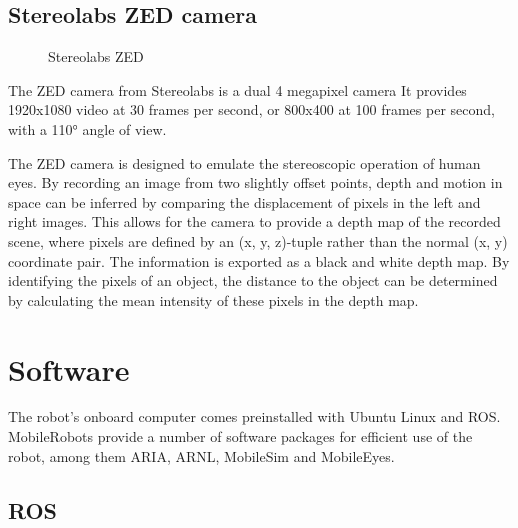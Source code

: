 \documentclass[\rootfolder/main.tex]{subfiles}
\begin{document}

\subsection{Stereolabs ZED camera}

\begin{figure}
    \caption{Stereolabs ZED}
    \label{fig:zed-camera}
\end{figure}

The ZED camera from Stereolabs is a dual 4 megapixel camera
It provides 1920x1080 video at 30 frames per second, or 800x400 at 100 frames per second, with a \ang{110} angle of view.

The ZED camera is designed to emulate the stereoscopic operation of human eyes.
By recording an image from two slightly offset points, depth and motion in space can be inferred by comparing the displacement of pixels in the left and right images.
This allows for the camera to provide a depth map of the recorded scene, where pixels are defined by an (x, y, z)-tuple rather than the normal (x, y) coordinate pair.
The information is exported as a black and white depth map.
By identifying the pixels of an object, the distance to the object can be determined by calculating the mean intensity of these pixels in the depth map.


\section{Software}

The robot's onboard computer comes preinstalled with Ubuntu Linux and ROS.
MobileRobots provide a number of software packages for efficient use of the robot, among them ARIA, ARNL, MobileSim and MobileEyes.


\subsection{ROS}
\end{document}
